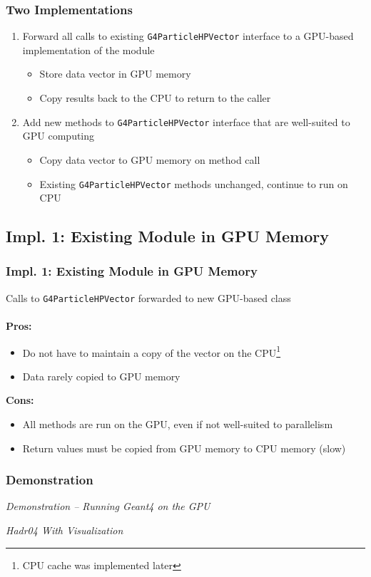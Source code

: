 \documentclass{beamer}
\newcommand\pro{\item[$+$]}
\newcommand\con{\item[$-$]}
\begin{document}
\begin{frame}
\frametitle{Two Implementations}
\begin{enumerate}
\item Forward all calls to existing \texttt{G4ParticleHPVector} interface to a GPU-based implementation of the module

\begin{itemize}
\item Store data vector in GPU memory
\item Copy results back to the CPU to return to the caller
\end{itemize}

\item Add new methods to \texttt{G4ParticleHPVector} interface that are well-suited to GPU computing
\begin{itemize}
\item Copy data vector to GPU memory on method call
\item Existing \texttt{G4ParticleHPVector} methods unchanged, continue to run on CPU
\end{itemize}
\end{enumerate}
\end{frame}

\subsection{Impl. 1: Existing Module in GPU Memory}
\begin{frame}
\frametitle{Impl. 1: Existing Module in GPU Memory}
Calls to \texttt{G4ParticleHPVector} forwarded to new GPU-based class\\~\\

\textbf{Pros:}
\begin{itemize}
\pro Do not have to maintain a copy of the vector on the CPU\footnote{CPU cache was implemented later}
\pro Data rarely copied to GPU memory
\end{itemize}
\textbf{Cons:}
\begin{itemize}
\con All methods are run on the GPU, even if not well-suited to parallelism
\con Return values must be copied from GPU memory to CPU memory (slow)
\end{itemize}
\end{frame}

\begin{frame}
\frametitle{Demonstration}
\begin{center}
\emph{Demonstration -- Running Geant4 on the GPU}

\emph{Hadr04 With Visualization}

\end{center}
\end{frame}
\end{document}
